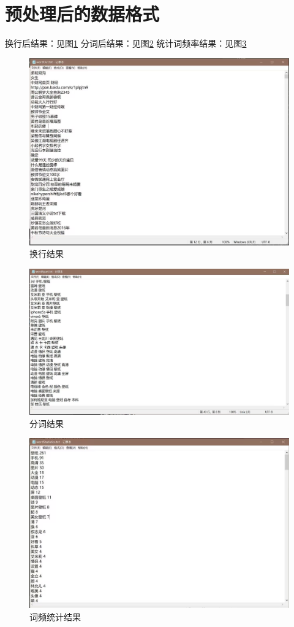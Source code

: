 \documentclass[12pt, a4paper, oneside]{ctexbook}
\begin{document}
\section{预处理后的数据格式}
换行后结果：见图\ref{fig:example1}
分词后结果：见图\ref{fig:example2}
统计词频率结果：见图\ref{fig:example3}
\begin{figure}[htbp]
    \centering
    \includegraphics[scale=0.3]{换行.jpg}
    \caption{换行结果}
    \label{fig:example1}
\end{figure}
\begin{figure}[htbp]
    \centering
    \includegraphics[scale=0.2]{分词.jpg}
    \caption{分词结果}
    \label{fig:example2}
\end{figure}
\begin{figure}[htbp]
    \centering
    \includegraphics[scale=0.3]{词频.jpg}
    \caption{词频统计结果}
    \label{fig:example3}
\end{figure}
\end{document}
